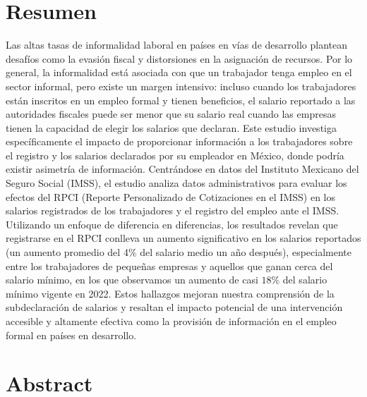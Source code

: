 \documentclass[10pt, oneside]{book}
\begin{document}
\chapter*{Resumen}

\noindent Las altas tasas de informalidad laboral en países en vías de desarrollo plantean desafíos como la evasión fiscal y distorsiones en la asignación de recursos. Por lo general, la informalidad está asociada con que un trabajador tenga empleo en el sector informal, pero existe un margen intensivo: incluso cuando los trabajadores están inscritos en un empleo formal y tienen beneficios, el salario reportado a las autoridades fiscales puede ser menor que su salario real cuando las empresas tienen la capacidad de elegir los salarios que declaran. Este estudio investiga específicamente el impacto de proporcionar información a los trabajadores sobre el registro y los salarios declarados por su empleador en México, donde podría existir asimetría de información. Centrándose en datos del Instituto Mexicano del Seguro Social (IMSS), el estudio analiza datos administrativos para evaluar los efectos del RPCI (Reporte Personalizado de Cotizaciones en el IMSS) en los salarios registrados de los trabajadores y el registro del empleo ante el IMSS. Utilizando un enfoque de diferencia en diferencias, los resultados revelan que registrarse en el RPCI conlleva un aumento significativo en los salarios reportados (un aumento promedio del 4\% del salario medio un año después), especialmente entre los trabajadores de pequeñas empresas y aquellos que ganan cerca del salario mínimo, en los que observamos un aumento de casi $18\%$ del salario mínimo vigente en 2022. Estos hallazgos mejoran nuestra comprensión de la subdeclaración de salarios y resaltan el impacto potencial de una intervención accesible y altamente efectiva como la provisión de información en el empleo formal en países en desarrollo.

\pagestyle{plain}

\noindent 


\chapter*{Abstract}
\end{document}
